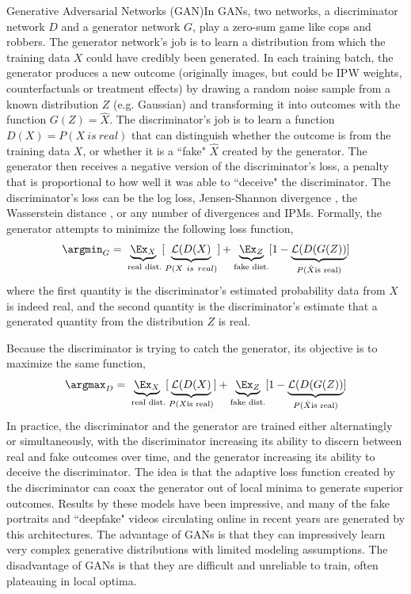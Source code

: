 \begin{TCBBox}[label=box:gan]{Generative Adversarial Networks (GAN)}In GANs, two networks, a discriminator network $D$ and a generator network $G$, play a zero-sum game like cops and robbers. The generator network's job is to learn a distribution from which the training data $X$ could have credibly been generated. In each training batch, the generator produces a new outcome (originally images, but could be IPW weights, counterfactuals or treatment effects) by drawing a random noise sample from a known distribution $Z$ (e.g. Gaussian) and transforming it into outcomes with the function $G(Z)=\hat{X}$. The discriminator's job is to learn a function $D(X)=P(X\ is\ real)$ that can distinguish whether the outcome is from the training data $X$, or whether it is a ``fake" $\hat{X}$ created by the generator. The generator then receives a negative version of the discriminator's loss, a penalty that is proportional to how well it was able to ``deceive" the discriminator.  The discriminator's loss can be the log loss,  Jensen-Shannon divergence \citep{goodfellow2014generative}, the Wasserstein distance \citep{arjovsky2017wasserstein, gulrajani2017improved}, or any number of divergences and IPMs. Formally, the generator attempts to minimize the following loss function,
\begin{equation*}
\argmin_{G}=\underbrace{\Ex_{X}}_{\text{ real dist.}}[\underbrace{\mathcal{L}(D(X)}_{P(X\ is\ real)}] + \underbrace{\Ex_{Z}}_{\text{fake dist.}}[1-\underbrace{\mathcal{L}(D(G(Z))}_{P(\hat{X}\text{is real})}]
\end{equation*}
where the first quantity is the discriminator's estimated probability data from $X$ is indeed real, and the second quantity is the discriminator's estimate that a generated quantity from the distribution $Z$ is real. 

Because the discriminator is trying to catch the generator, its objective is to maximize the same function,
\begin{equation*}
\argmax_{D}=\underbrace{\Ex_{X}}_{\text{ real dist.}}[\underbrace{\mathcal{L}(D(X)}_{P(X \text{is real})}] + \underbrace{\Ex_{Z}}_{\text{fake dist.}}[1-\underbrace{\mathcal{L}(D(G(Z))}_{P(\hat{X}\text{is real})}]
\end{equation*}
In practice, the discriminator and the generator are trained either alternatingly or simultaneously, with the discriminator increasing its ability to discern between real and fake outcomes over time, and the generator increasing its ability to deceive the discriminator. The idea is that the adaptive loss function created by the discriminator can coax the generator out of local minima to generate superior outcomes. Results by these models have been impressive, and many of the fake portraits and ``deepfake" videos circulating online in recent years are generated by this architectures. The advantage of GANs is that they can impressively learn very complex generative distributions with limited modeling assumptions. The disadvantage of GANs is that they are difficult and unreliable to train, often plateauing in local optima.
\end{TCBBox}
\label{Box:GANs}

